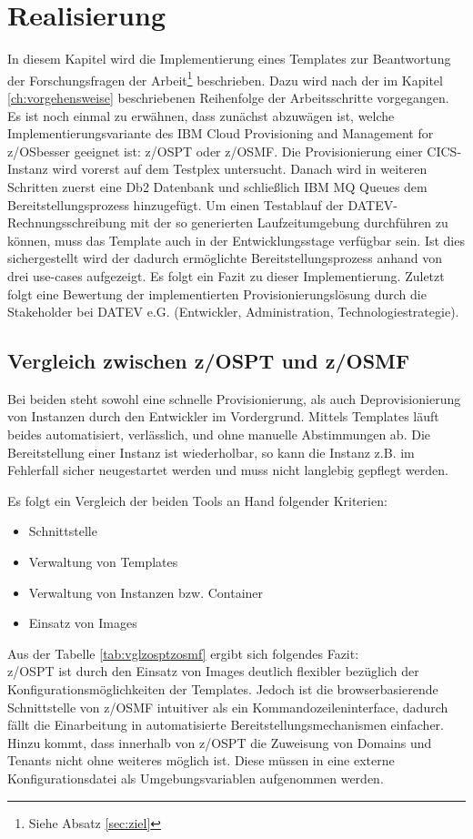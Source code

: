 \chapter{Realisierung}\label{ch:realisierung}
In diesem Kapitel wird die Implementierung eines Templates zur Beantwortung der Forschungsfragen der Arbeit\footnote{Siehe Absatz \ref{sec:ziel}} beschrieben.
Dazu wird nach der im Kapitel \ref{ch:vorgehensweise} beschriebenen Reihenfolge der Arbeitsschritte vorgegangen.
Es ist noch einmal zu erwähnen, dass zunächst abzuwägen ist, welche Implementierungsvariante des \glqq IBM Cloud Provisioning and Management for z/OS\grqq besser geeignet ist: z/OSPT oder z/OSMF.
Die Provisionierung einer CICS-Instanz wird vorerst auf dem Testplex untersucht.
Danach wird in weiteren Schritten zuerst eine Db2 Datenbank und schließlich IBM MQ Queues dem Bereitstellungsprozess hinzugefügt.
Um einen Testablauf der DATEV-Rechnungsschreibung mit der so generierten Laufzeitumgebung durchführen zu können, muss das Template auch in der Entwicklungsstage verfügbar sein.
Ist dies sichergestellt wird der dadurch ermöglichte Bereitstellungsprozess anhand von drei use-cases aufgezeigt.
Es folgt ein Fazit zu dieser Implementierung.
Zuletzt folgt eine Bewertung der implementierten Provisionierungslösung durch die Stakeholder bei DATEV e.G. (Entwickler, Administration, Technologiestrategie).

\section{Vergleich zwischen z/OSPT und z/OSMF}
Bei beiden steht sowohl eine schnelle Provisionierung, als auch Deprovisionierung von Instanzen durch den Entwickler im Vordergrund.
Mittels Templates läuft beides automatisiert, verlässlich, und ohne manuelle Abstimmungen ab.
Die Bereitstellung einer Instanz ist wiederholbar, so kann die Instanz z.B. im Fehlerfall sicher neugestartet werden und muss nicht langlebig gepflegt werden.

Es folgt ein Vergleich der beiden Tools an Hand folgender Kriterien:
\begin{itemize}
\item Schnittstelle
\item Verwaltung von Templates
\item Verwaltung von Instanzen bzw. Container
\item Einsatz von Images
\end{itemize}

Aus der Tabelle \ref{tab:vglzosptzosmf} ergibt sich folgendes Fazit:\\
z/OSPT ist durch den Einsatz von Images deutlich flexibler bezüglich der Konfigurationsmöglichkeiten der Templates.
Jedoch ist die browserbasierende Schnittstelle von z/OSMF intuitiver als ein Kommandozeileninterface, dadurch fällt die Einarbeitung in automatisierte Bereitstellungsmechanismen einfacher.
Hinzu kommt, dass innerhalb von z/OSPT die Zuweisung von Domains und Tenants nicht ohne weiteres möglich ist.
Diese müssen in eine externe Konfigurationsdatei als Umgebungsvariablen aufgenommen werden.

